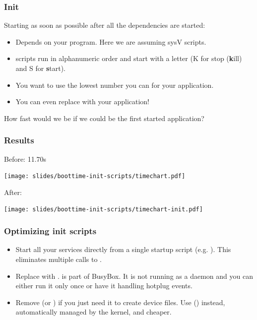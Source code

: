 \begin{frame}
\frametitle{Init}
Starting as soon as possible after all the dependencies are started:
\begin{itemize}
	\item Depends on your  program. Here we are assuming sysV
	       scripts.
	\item {} scripts run in alphanumeric order and start with
	      a letter (K for stop ({\bf k}ill) and S for {\bf s}tart).
	\item You want to use the lowest number you can for your application.
	\item You can even replace  with your application!
\end{itemize}
How fast would we be if we could be the first started application?
\end{frame}

\begin{frame}
\frametitle{Results}
Before: 11.70s
\begin{center}
    \texttt{[image: slides/boottime-init-scripts/timechart.pdf]}
\end{center}
After:
\begin{center}
    \texttt{[image: slides/boottime-init-scripts/timechart-init.pdf]}
\end{center}
\end{frame}

\begin{frame}
\frametitle{Optimizing init scripts}
\begin{itemize}
	\item Start all your services directly from a single startup
	      script (e.g. ). This eliminates multiple
	      calls to .
	\item Replace  with .  is part of
	      BusyBox. It is not running as a daemon and you can either run it
   	      only once or have it handling hotplug events.
	\item Remove  (or ) if you just need it
	      to create device files.  Use 
	      () instead, automatically managed by the
	      kernel, and cheaper.
\end{itemize}
\end{frame}

